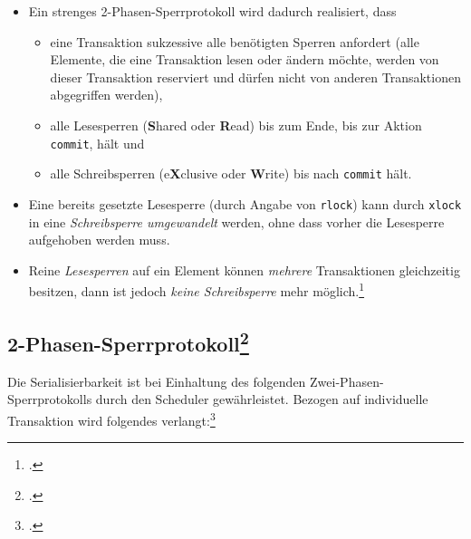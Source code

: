 \documentclass{bschlangaul-theorie}
\begin{document}
\begin{itemize}
\item Ein strenges 2-Phasen-Sperrprotokoll wird dadurch realisiert, dass

\begin{itemize}
\item eine Transaktion sukzessive alle benötigten Sperren anfordert
(alle Elemente, die eine Transaktion lesen oder ändern möchte, werden
von dieser Transaktion reserviert und dürfen nicht von anderen
Transaktionen abgegriffen werden),

\item alle Lesesperren (\textbf{S}hared oder \textbf{R}ead) bis zum
Ende, \dh bis zur Aktion \texttt{commit}, hält und

\item alle Schreibsperren (e\textbf{X}clusive oder \textbf{W}rite) bis
nach \texttt{commit} hält.
\end{itemize}

\item Eine bereits gesetzte Lesesperre (durch Angabe von \texttt{rlock})
kann durch \texttt{xlock} in eine \emph{Schreibsperre umgewandelt}
werden, ohne dass vorher die Lesesperre aufgehoben werden muss.

\item Reine \emph{Lesesperren} auf ein Element können \emph{mehrere}
Transaktionen gleichzeitig besitzen, dann ist jedoch \emph{keine
Schreibsperre} mehr möglich.\footcite[11.6.2 Zwei-Phasen-Sperrprotokoll, Seite 346]{kemper}
\end{itemize}

%

\subsection{2-Phasen-Sperrprotokoll\footcite[Seite 16]{db:fs:5}}

Die Serialisierbarkeit ist bei Einhaltung des folgenden
Zwei-Phasen-Sperrprotokolls durch den Scheduler gewährleistet. Bezogen
auf individuelle Transaktion wird folgendes verlangt:\footcite{wiki:sperrverfahren}
\end{document}
